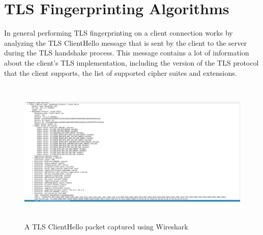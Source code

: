 \documentclass[12pt]{scrbook}
\begin{document}
\section{TLS Fingerprinting Algorithms}
In general performing TLS fingerprinting on a client connection works by analyzing the TLS ClientHello
message that is sent by the client to the server during the TLS handshake
process. This message contains a lot of information about the client's TLS
implementation, including the version of the TLS protocol that the client
supports, the list of supported cipher suites and extensions.
\begin{figure}[!htb]
  \centering
  \includegraphics[height=7cm]{./images/tls_client_hello_wireshark.png}
  \caption{A TLS ClientHello packet captured using Wireshark}
\end{figure}
\end{document}
